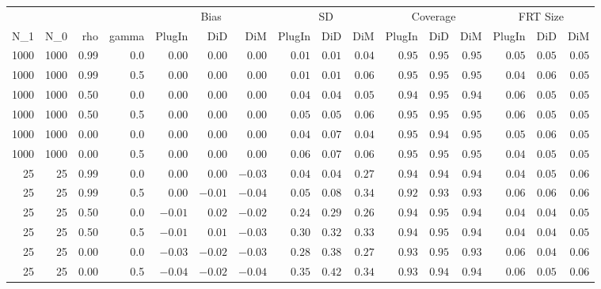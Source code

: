 \captionsetup[table]{labelformat=empty,skip=1pt}
\begin{longtable}{rrrrrrrrrrrrrrrr}
\toprule
 &  &  &  & \multicolumn{3}{c}{Bias} & \multicolumn{3}{c}{SD} & \multicolumn{3}{c}{Coverage} & \multicolumn{3}{c}{FRT Size} \\ 
 \cmidrule(lr){5-7} \cmidrule(lr){8-10} \cmidrule(lr){11-13} \cmidrule(lr){14-16}
N\_1 & N\_0 & rho & gamma & PlugIn & DiD & DiM & PlugIn & DiD & DiM & PlugIn & DiD & DiM & PlugIn & DiD & DiM \\ 
\midrule
1000 & 1000 & 0.99 & 0.0 & $0.00$ & $0.00$ & $0.00$ & $0.01$ & $0.01$ & $0.04$ & $0.95$ & $0.95$ & $0.95$ & $0.05$ & $0.05$ & $0.05$ \\ 
1000 & 1000 & 0.99 & 0.5 & $0.00$ & $0.00$ & $0.00$ & $0.01$ & $0.01$ & $0.06$ & $0.95$ & $0.95$ & $0.95$ & $0.04$ & $0.06$ & $0.05$ \\ 
1000 & 1000 & 0.50 & 0.0 & $0.00$ & $0.00$ & $0.00$ & $0.04$ & $0.04$ & $0.05$ & $0.94$ & $0.95$ & $0.94$ & $0.06$ & $0.05$ & $0.05$ \\ 
1000 & 1000 & 0.50 & 0.5 & $0.00$ & $0.00$ & $0.00$ & $0.05$ & $0.05$ & $0.06$ & $0.95$ & $0.95$ & $0.95$ & $0.06$ & $0.05$ & $0.05$ \\ 
1000 & 1000 & 0.00 & 0.0 & $0.00$ & $0.00$ & $0.00$ & $0.04$ & $0.07$ & $0.04$ & $0.95$ & $0.94$ & $0.95$ & $0.05$ & $0.06$ & $0.05$ \\ 
1000 & 1000 & 0.00 & 0.5 & $0.00$ & $0.00$ & $0.00$ & $0.06$ & $0.07$ & $0.06$ & $0.95$ & $0.95$ & $0.95$ & $0.04$ & $0.05$ & $0.05$ \\ 
25 & 25 & 0.99 & 0.0 & $0.00$ & $0.00$ & $-0.03$ & $0.04$ & $0.04$ & $0.27$ & $0.94$ & $0.94$ & $0.94$ & $0.04$ & $0.05$ & $0.06$ \\ 
25 & 25 & 0.99 & 0.5 & $0.00$ & $-0.01$ & $-0.04$ & $0.05$ & $0.08$ & $0.34$ & $0.92$ & $0.93$ & $0.93$ & $0.06$ & $0.06$ & $0.06$ \\ 
25 & 25 & 0.50 & 0.0 & $-0.01$ & $0.02$ & $-0.02$ & $0.24$ & $0.29$ & $0.26$ & $0.94$ & $0.95$ & $0.94$ & $0.04$ & $0.04$ & $0.05$ \\ 
25 & 25 & 0.50 & 0.5 & $-0.01$ & $0.01$ & $-0.03$ & $0.30$ & $0.32$ & $0.33$ & $0.94$ & $0.95$ & $0.94$ & $0.04$ & $0.04$ & $0.05$ \\ 
25 & 25 & 0.00 & 0.0 & $-0.03$ & $-0.02$ & $-0.03$ & $0.28$ & $0.38$ & $0.27$ & $0.93$ & $0.95$ & $0.93$ & $0.06$ & $0.04$ & $0.06$ \\ 
25 & 25 & 0.00 & 0.5 & $-0.04$ & $-0.02$ & $-0.04$ & $0.35$ & $0.42$ & $0.34$ & $0.93$ & $0.94$ & $0.94$ & $0.06$ & $0.05$ & $0.06$ \\ 
 \bottomrule
\end{longtable}

